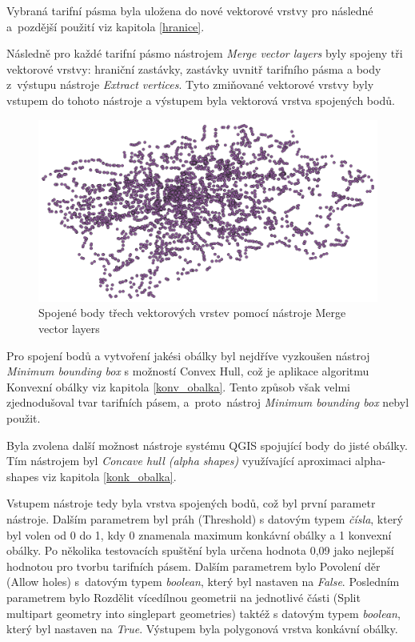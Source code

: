 Vybraná tarifní pásma byla uložena do nové vektorové vrstvy pro následné a~pozdější použití viz kapitola \ref{hranice}.

Následně pro každé tarifní pásmo nástrojem \textit{Merge vector layers} byly spojeny tři vektorové vrstvy: hraniční zastávky, 
zastávky uvnitř tarifního pásma a body z~výstupu nástroje \textit{Extract vertices}.
Tyto zmiňované vektorové vrstvy byly vstupem do tohoto nástroje a výstupem byla 
vektorová vrstva spojených bodů. 

\begin{figure}[H] \centering
    \includegraphics[width=400pt]{./pictures/merged-P0B.png}
    \caption[Spojené body třech vektorových vrstev pomocí nástroje Merge vector layers]{Spojené body třech vektorových vrstev pomocí nástroje Merge vector layers}
	\label{fig:merged-P0B}              
\end{figure} 

Pro spojení bodů a vytvoření jakési obálky byl nejdříve vyzkoušen nástroj \textit{Mi\-nimum bounding box} s možností Convex Hull,
což je aplikace algoritmu Konvexní obálky viz kapitola \ref{konv_obalka}. Tento způsob však velmi zjednodušoval tvar
tarifních pásem, a~proto~nástroj \textit{Minimum bounding box} nebyl použit.

Byla zvolena další možnost nástroje systému QGIS spojující body do jisté obálky. Tím nástrojem byl \textit{Concave hull (alpha shapes)} 
využívající aproximaci alpha-shapes viz kapitola \ref{konk_obalka}.

Vstupem nástroje tedy byla vrstva spojených bodů, což byl první parametr
nástroje. Dalším parametrem byl práh (Threshold) s datovým typem \textit{čísla}, který byl volen od 0 do 1,
kdy 0 znamenala maximum konkávní obálky a 1 konvexní obálky. Po několika testovacích spuštění byla 
určena hodnota 0,09 jako nejlepší hodnotou pro tvorbu tarifních pásem. Dalším parametrem bylo Povolení děr (Allow holes) 
s~datovým typem \textit{boolean}, který byl nastaven na \textit{False}.
Posledním parametrem bylo Rozdělit vícedílnou geometrii na jednotlivé části (Split multipart geometry 
into singlepart geometries) taktéž s datovým typem \textit{boolean}, který byl nastaven na \textit{True}.  
Výstupem byla polygonová vrstva konkávní obálky. 

